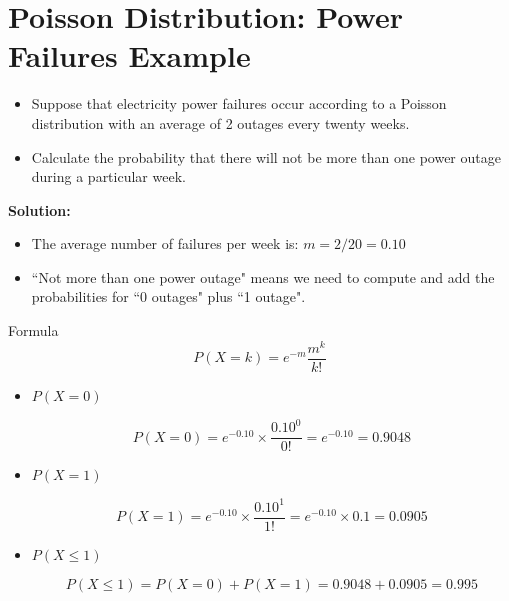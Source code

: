 \documentclass[a4paper,12pt]{article}
\begin{document}
\section*{Poisson Distribution: Power Failures Example}
\begin{itemize}
	
	\item Suppose that electricity power failures occur according to a Poisson distribution
	with an average of 2 outages every twenty weeks. \item Calculate the probability that there will
	not be more than one power outage during a particular week.
\end{itemize}

\textbf{Solution:}

\begin{itemize}
	\item The average number of failures per week is: $m = 2/20 = 0.10$
	
	\item ``Not more than one  power outage" means we need to compute and add the probabilities for ``0 outages" plus ``1 outage".
\end{itemize}


\begin{framed}
Formula \[P(X = k) = e^{-m}\frac{m^k}{k!}\]
\end{framed}

\begin{itemize}
	
	\item $P(X = 0)$
	
	\[P(X = 0) = e^{-0.10} \times \frac{0.10^0}{0!} = e^{-0.10} = 0.9048\]
	
	
	\item $P(X = 1)$
	
	\[P(X = 1) = e^{-0.10}\times \frac{0.10^1}{1!} = e^{-0.10}\times 0.1 = 0.0905\]
	
	\item $P(X \leq 1)$
	
	\[P(X \leq 1) = P(X = 0) + P(X = 1) = 0.9048 + 0.0905 = 0.995\]
	
\end{itemize}	
\end{document}
